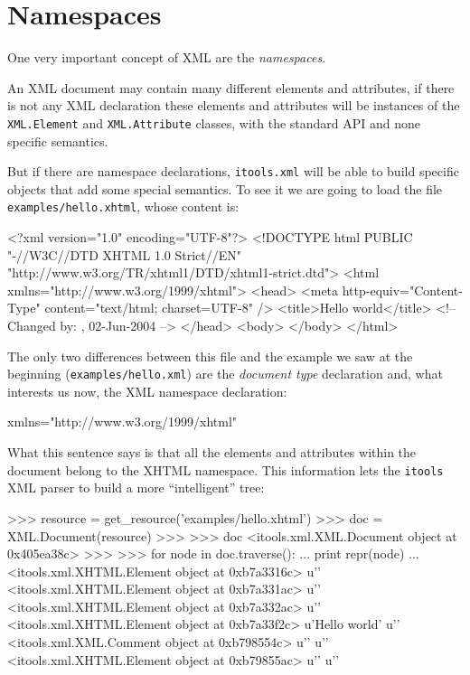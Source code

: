 \section{Namespaces}

One very important concept of XML are the {\em namespaces}.

An XML document may contain many different elements and attributes, if there
is not any XML declaration these elements and attributes will be instances
of the {\tt XML.Element} and {\tt XML.Attribute} classes, with the standard
API and none specific semantics.

But if there are namespace declarations, {\tt itools.xml} will be able to
build specific objects that add some special semantics. To see it we are
going to load the file {\tt examples/hello.xhtml}, whose content is:

\begin{code}
    <?xml version="1.0" encoding="UTF-8"?>
    <!DOCTYPE html PUBLIC "-//W3C//DTD XHTML 1.0 Strict//EN"
           "http://www.w3.org/TR/xhtml1/DTD/xhtml1-strict.dtd">
    <html xmlns="http://www.w3.org/1999/xhtml">
      <head>
        <meta http-equiv="Content-Type" content="text/html; charset=UTF-8" />
        <title>Hello world</title>
        <!-- Changed by: , 02-Jun-2004 -->
      </head>
      <body>
      </body>
    </html>
\end{code}

The only two differences between this file and the example we saw at the
beginning ({\tt examples/hello.xml}) are the {\em document type} declaration
and, what interests us now, the XML namespace declaration:

\begin{code}
    xmlns="http://www.w3.org/1999/xhtml"
\end{code}

What this sentence says is that all the elements and attributes within the
document belong to the XHTML namespace. This information lets the {\tt itools}
XML parser to build a more ``intelligent'' tree:

\begin{code}
    >>> resource = get_resource('examples/hello.xhtml')
    >>> doc = XML.Document(resource)
    >>> 
    >>> doc
    <itools.xml.XML.Document object at 0x405ea38c>
    >>> 
    >>> for node in doc.traverse():
    ...     print repr(node)
    ... 
    <itools.xml.XHTML.Element object at 0xb7a3316c>
    u'\n  '
    <itools.xml.XHTML.Element object at 0xb7a331ac>
    u'\n    '
    <itools.xml.XHTML.Element object at 0xb7a332ac>
    u'\n    '
    <itools.xml.XHTML.Element object at 0xb7a33f2c>
    u'Hello world'
    u'\n    '
    <itools.xml.XML.Comment object at 0xb798554c>
    u'\n  '
    u'\n  '
    <itools.xml.XHTML.Element object at 0xb79855ac>
    u'\n  '
    u'\n'
\end{code}

